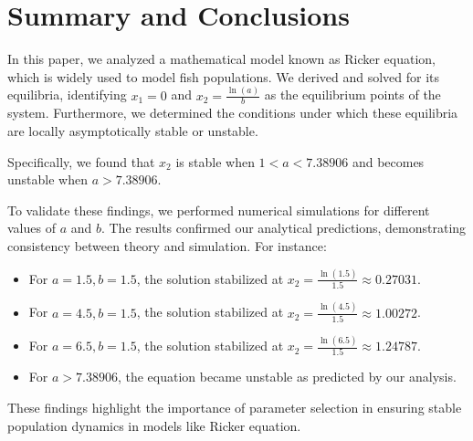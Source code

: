 \documentclass [a4paper]{article}
\begin{document}
\section{Summary and Conclusions}

In this paper, we analyzed a mathematical model known as Ricker equation, which is widely used to model fish populations. We derived and solved for its equilibria, identifying \( x_1 = 0 \) and \( x_2 = \frac{\ln(a)}{b} \) as the equilibrium points of the system. Furthermore, we determined the conditions under which these equilibria are locally asymptotically stable or unstable.

Specifically, we found that \( x_2 \) is stable when \( 1 < a < 7.38906 \) and becomes unstable when \( a > 7.38906 \).

To validate these findings, we performed numerical simulations for different values of \( a \) and \( b \). The results confirmed our analytical predictions, demonstrating consistency between theory and simulation. For instance:
\begin{itemize}
    \item For \( a = 1.5, b = 1.5 \), the solution stabilized at \( x_2 = \frac{\ln(1.5)}{1.5} \approx 0.27031 \).
    \item For \( a = 4.5, b = 1.5 \), the solution stabilized at \( x_2 = \frac{\ln(4.5)}{1.5} \approx 1.00272 \).
    \item For \( a = 6.5, b = 1.5 \), the solution stabilized at \( x_2 = \frac{\ln(6.5)}{1.5} \approx 1.24787 \).
    \item For \( a > 7.38906 \), the equation became unstable as predicted by our analysis.
\end{itemize}
These findings highlight the importance of parameter selection in ensuring stable population dynamics in models like Ricker equation. 
 
\end{document}
